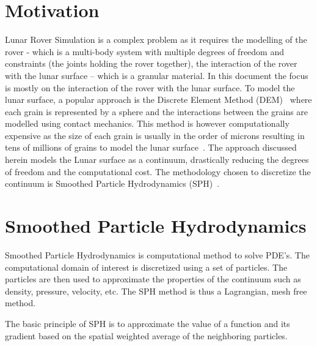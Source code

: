 \documentclass{article}
\begin{document}
\section{Motivation}
Lunar Rover Simulation is a complex problem as it requires the modelling of the rover - which is a multi-body system with multiple degrees of freedom and constraints (the joints holding the rover together), the interaction of the rover with the lunar surface -- which is a granular material. In this document the focus is mostly on the interaction of the rover with the lunar surface. To model the lunar surface, a popular approach is the Discrete Element Method (DEM)~\citep{zhang2023gpu} where each grain is represented by a sphere and the interactions between the grains are modelled using contact mechanics. This method is however computationally expensive as the size of each grain is usually in the order of microns resulting in tens of millions of grains to model the lunar surface~\citep{carrier1973lunar}. The approach discussed herein models the Lunar surface as a continuum, drastically reducing the degrees of freedom and the computational cost. The methodology chosen to discretize the continuum is Smoothed Particle Hydrodynamics (SPH)~\citep{monaghan1992smoothed}.

\section{Smoothed Particle Hydrodynamics}
Smoothed Particle Hydrodynamics is computational method to solve PDE's. The computational domain of interest is discretized using a set of particles. The particles are then used to approximate the properties of the continuum such as density, pressure, velocity, etc. The SPH method is thus a Lagrangian, mesh free method.  

The basic principle of SPH is to approximate the value of a function and its gradient based on the spatial weighted average of the neighboring particles. 
\end{document}
